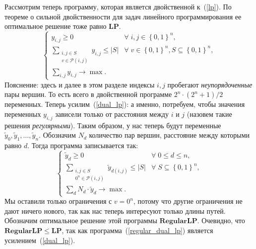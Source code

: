 \documentclass[12pt]{article}
\newcommand{\set}[1]{\left\{#1\right\}}
\newcommand{\abs}[1]{\left|#1\right|}
\newcommand{\zo}{\set{0, 1}}
\newcommand{\Pc}{\mathcal{P}}
\begin{document}
    Рассмотрим теперь программу, которая является двойственной к~(\ref{lp}).
    По теореме о сильной двойственности для задач линейного программирования ее оптимальное решение тоже равно $\mathbf{LP}$.
    \begin{equation}
        \label{dual_lp}
        \begin{cases}
            y_{i,j} \geq 0 & \forall \; i, j \in \zo^n, \\ 
            \sum_{\begin{smallmatrix}i, j \in S \\ v \in \Pc(i, j)\end{smallmatrix}} y_{i,j} \leq \abs{S} & \forall \; v \in \zo^n, S \subseteq \zo^n,  \\
            \sum_{i,j} y_{i,j} \to \max.
        \end{cases}
    \end{equation}
    Пояснение: здесь и далее в этом разделе индексы $i, j$ пробегают \emph{неупорядоченные} пары вершин. То есть
    всего в двойственной программе $2^n \cdot (2^n + 1) / 2$ переменных.
    Теперь усилим~(\ref{dual_lp}): а именно, потребуем, чтобы значения переменных $y_{i,j}$ зависели только от расстояния между $i$ и $j$ (назовем такие
    решения \emph{регулярными}).
    Таким образом, у нас теперь будут переменные $\tilde{y}_0, \tilde{y}_1, \ldots, \tilde{y}_n$.
    Обозначим $N_d$ количество пар вершин, расстояние между которыми равно $d$. Тогда программа записывается так:
    \begin{equation}
        \label{regular_dual_lp}
        \begin{cases}
            \tilde{y}_d \geq 0 & \forall \; 0 \leq d \leq n, \\
            \sum_{\begin{smallmatrix}i, j \in S \\ 0^n \in \Pc(i, j)\end{smallmatrix}} \tilde{y}_{d(i, j)} \leq \abs{S} & \forall \; S \subseteq \zo^n, \\
            \sum_{d} N_d \cdot \tilde{y}_d \to \max.
        \end{cases}
    \end{equation}
    Мы оставили только ограничения с $v = 0^n$, потому что другие ограничения не дают ничего нового, так как нас теперь интересуют только длины путей.
    Обозначим оптимальное решение этой программы $\mathbf{RegularLP}$.
    Очевидно, что $\mathbf{RegularLP} \leq \mathbf{LP}$, так как программа~(\ref{regular_dual_lp}) является
    усилением~(\ref{dual_lp}).
\end{document}
